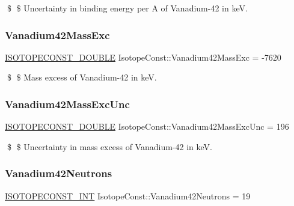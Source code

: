 \$ \$ Uncertainty in binding energy per A of Vanadium-\/42 in keV. \mbox{\label{group___isotope_const-_vanadium-_v42_ga087a65731033a81f6cfadfc936d63b09}} 
\subsubsection{\texorpdfstring{Vanadium42\+Mass\+Exc}{Vanadium42MassExc}}
{\footnotesize\ttfamily \mbox{\hyperlink{group___isotope_const-_macros_ga8f45a7272ce02c0b4c65c44636ed719a}{I\+S\+O\+T\+O\+P\+E\+C\+O\+N\+S\+T\+\_\+\+D\+O\+U\+B\+LE}} Isotope\+Const\+::\+Vanadium42\+Mass\+Exc = -\/7620}

\$ \$ Mass excess of Vanadium-\/42 in keV. \mbox{\label{group___isotope_const-_vanadium-_v42_gaad5b366fdb4297995fa2200ec0a8f39b}} 
\subsubsection{\texorpdfstring{Vanadium42\+Mass\+Exc\+Unc}{Vanadium42MassExcUnc}}
{\footnotesize\ttfamily \mbox{\hyperlink{group___isotope_const-_macros_ga8f45a7272ce02c0b4c65c44636ed719a}{I\+S\+O\+T\+O\+P\+E\+C\+O\+N\+S\+T\+\_\+\+D\+O\+U\+B\+LE}} Isotope\+Const\+::\+Vanadium42\+Mass\+Exc\+Unc = 196}

\$ \$ Uncertainty in mass excess of Vanadium-\/42 in keV. \mbox{\label{group___isotope_const-_vanadium-_v42_gaf79c2828524366f7be65088d652d6ed3}} 
\subsubsection{\texorpdfstring{Vanadium42\+Neutrons}{Vanadium42Neutrons}}
{\footnotesize\ttfamily \mbox{\hyperlink{group___isotope_const-_macros_ga5f18360b3e99483a35c32d789e62621c}{I\+S\+O\+T\+O\+P\+E\+C\+O\+N\+S\+T\+\_\+\+I\+NT}} Isotope\+Const\+::\+Vanadium42\+Neutrons = 19}


